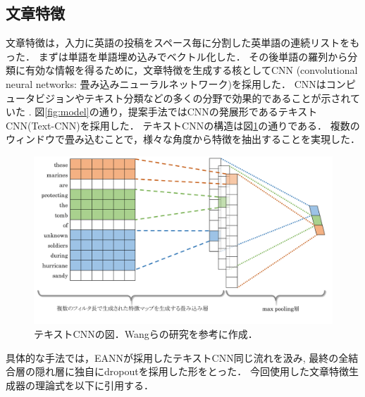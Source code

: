 \subsection{文章特徴} \label{subsec:text}
文章特徴は，入力に英語の投稿をスペース毎に分割した英単語の連続リストをもった．
まずは単語を単語埋め込みでベクトル化した．
その後単語の羅列から分類に有効な情報を得るために，文章特徴を生成する核としてCNN
(convolutional neural networks: 畳み込みニューラルネットワーク)を採用した．
CNNはコンピュータビジョンやテキスト分類などの多くの分野で効果的であることが示されていた
\cite{collobert2011natural,KalchbrennerACL2014}.
図\ref{fig:model}の通り，提案手法ではCNNの発展形であるテキストCNN(Text-CNN)\cite{DBLP:journals/corr/Kim14f}を採用した．
テキストCNNの構造は図\ref{fig:text-cnn}の通りである．
複数のウィンドウで畳み込むことで，様々な角度から特徴を抽出することを実現した．
\begin{figure}[H]
    \centering
    \includegraphics[width=\linewidth]{images/text-cnn.pdf}
    \caption{テキストCNNの図．Wangらの研究\cite{Wang:2018:EEA:3219819.3219903}を参考に作成．}
    \label{fig:text-cnn}
\end{figure}

具体的な手法では，EANNが採用したテキストCNN同じ流れを汲み\cite{Wang:2018:EEA:3219819.3219903},
最終の全結合層の隠れ層に独自にdropoutを採用した形をとった．
今回使用した文章特徴生成器の理論式を以下に引用する．

